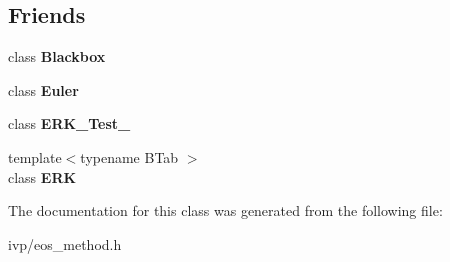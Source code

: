 \subsection*{Friends}
\begin{DoxyCompactItemize}
\item 
\mbox{\label{classOneStepMethod_af3aa570b8e278b935d7dc84d2774ccb7}} 
class {\bfseries Blackbox}
\item 
\mbox{\label{classOneStepMethod_a9e8c94ebada889fba517c82fc3408d32}} 
class {\bfseries Euler}
\item 
\mbox{\label{classOneStepMethod_a146a867264afb1cda48fa788ceca1f13}} 
class {\bfseries E\+R\+K\+\_\+\+Test\+\_}
\item 
\mbox{\label{classOneStepMethod_a55adbdc4c0fea0e770e4d18b0379d490}} 
{\footnotesize template$<$typename B\+Tab $>$ }\\class {\bfseries E\+RK}
\end{DoxyCompactItemize}


The documentation for this class was generated from the following file\+:\begin{DoxyCompactItemize}
\item 
ivp/eos\+\_\+method.\+h\end{DoxyCompactItemize}

